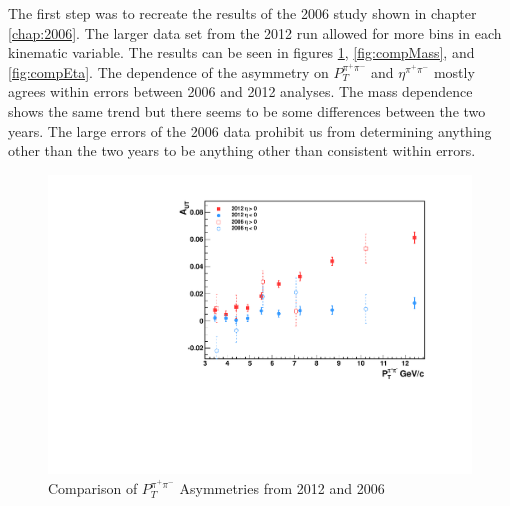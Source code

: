 \documentclass[letterpaper, abstract = on,listof=totoc, bibliography=totoc]{scrreprt}
\newcommand{\ptpair}{P_{T}^{\pi^+\pi^-}}
\newcommand{\etapair}{\eta^{\pi^+\pi^-}}
\begin{document}
The first step was to recreate the results of the 2006 study shown in chapter \ref{chap:2006}. The larger data set from the 2012 run allowed for more bins in each kinematic variable. The results can be seen in figures  \ref{fig:compPt}, \ref{fig:compMass}, and \ref{fig:compEta}. The dependence of the asymmetry on $\ptpair$ and $\etapair$ mostly agrees within errors between 2006 and 2012 analyses. The mass dependence shows the same trend but there seems to be some differences between the two years. The large errors of the 2006 data prohibit us from determining anything other than the two years to be anything other than consistent within errors.


\begin{figure}
\begin{center}
\includegraphics[width = .7\textwidth]{AutVPt0612_difMark}
\caption[$\ptpair$ Asymmetries 2012 and 2006]{Comparison of $\ptpair$ Asymmetries from 2012 and 2006}
\label{fig:compPt}
\end{center}
\end{figure}
\end{document}
